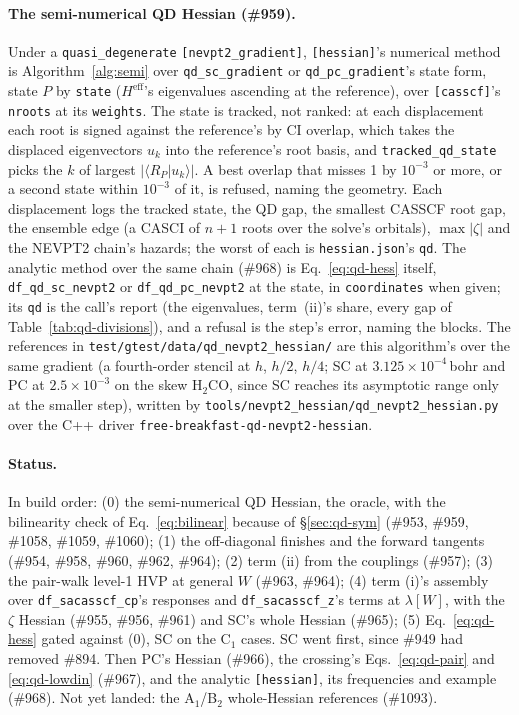 \documentclass[11pt]{article}
\newcommand{\code}[1]{\texttt{#1}}
\newcommand{\Heff}{H^{\mathrm{eff}}}
\begin{document}
\paragraph{The semi-numerical QD Hessian (\#959).} Under a
\code{quasi\_degenerate} \code{[nevpt2\_gradient]}, \code{[hessian]}'s
numerical method is Algorithm~\ref{alg:semi} over \code{qd\_sc\_gradient}
or \code{qd\_pc\_gradient}'s state form, state $P$ by \code{state}
($\Heff$'s eigenvalues ascending at the reference), over \code{[casscf]}'s
\code{nroots} at its \code{weights}. The state is tracked, not ranked: at
each displacement each root is signed against the reference's by CI
overlap, which takes the displaced eigenvectors $u_k$ into the reference's
root basis, and \code{tracked\_qd\_state} picks the $k$ of largest
$|\langle R_P|u_k\rangle|$. A best overlap that misses 1 by $10^{-3}$ or
more, or a second state within $10^{-3}$ of it, is refused, naming the
geometry. Each displacement logs the tracked state, the QD gap, the smallest
CASSCF root gap, the ensemble edge (a CASCI of $n + 1$ roots over the
solve's orbitals), $\max|\zeta|$ and the NEVPT2 chain's hazards; the worst
of each is \code{hessian.json}'s \code{qd}. The analytic method over the
same chain (\#968) is Eq.~\eqref{eq:qd-hess} itself,
\code{df\_qd\_sc\_nevpt2} or \code{df\_qd\_pc\_nevpt2} at the state, in
\code{coordinates} when given; its \code{qd} is the call's report (the
eigenvalues, term~(ii)'s share, every gap of
Table~\ref{tab:qd-divisions}), and a refusal is the step's error, naming
the blocks. The references in
\code{test/gtest/data/qd\_nevpt2\_hessian/} are this algorithm's over the
same gradient (a fourth-order stencil at $h$, $h/2$, $h/4$; SC at
$3.125\times10^{-4}$\,bohr and PC at $2.5\times10^{-3}$ on the skew H$_2$CO,
since SC reaches its asymptotic range only at the smaller step), written by
\code{tools/nevpt2\_hessian/qd\_nevpt2\_hessian.py} over the C++ driver
\code{free-breakfast-qd-nevpt2-hessian}.

\paragraph{Status.} In build order: (0) the semi-numerical QD Hessian, the
oracle, with the bilinearity check of Eq.~\eqref{eq:bilinear} because of
\S\ref{sec:qd-sym} (\#953, \#959, \#1058, \#1059, \#1060); (1) the off-diagonal
finishes and the forward tangents (\#954, \#958, \#960, \#962, \#964);
(2) term (ii) from the couplings (\#957); (3) the pair-walk level-1 HVP at
general $W$ (\#963, \#964); (4) term (i)'s assembly over
\code{df\_sacasscf\_cp}'s responses and \code{df\_sacasscf\_z}'s terms at
$\lambda[W]$, with the $\zeta$ Hessian (\#955, \#956, \#961) and SC's
whole Hessian (\#965); (5) Eq.~\eqref{eq:qd-hess} gated against (0), SC on
the C$_1$ cases. SC went first, since \#949 had removed \#894. Then
PC's Hessian (\#966), the crossing's Eqs.~\eqref{eq:qd-pair} and
\eqref{eq:qd-lowdin} (\#967), and the analytic \code{[hessian]}, its
frequencies and example (\#968). Not yet landed: the A$_1$/B$_2$
whole-Hessian references (\#1093).
\end{document}

